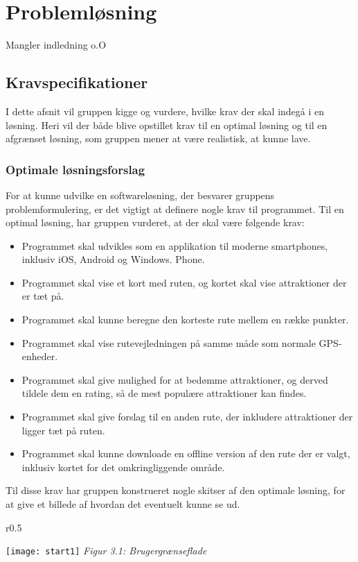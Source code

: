 \chapter{Problemløsning}
Mangler indledning o.O
\section{Kravspecifikationer}
I dette afsnit vil gruppen kigge og vurdere, hvilke krav der skal indegå i en løsning. Heri vil der både blive opstillet krav til en optimal løsning og til en afgrænset løsning, som gruppen mener at være realistisk, at kunne lave.

\subsection{Optimale løsningsforslag}
For at kunne udvilke en softwareløsning, der besvarer gruppens problemformulering, er det vigtigt at definere nogle krav til programmet. Til en optimal løsning, har gruppen vurderet, at der skal være følgende krav:
\begin{itemize}
	\item Programmet skal udvikles som en applikation til moderne smartphones, inklusiv iOS, Android og Windows. Phone. 
	\item Programmet skal vise et kort med ruten, og kortet skal vise attraktioner der er tæt på. 
	\item Programmet skal kunne beregne den korteste rute mellem en række punkter.
	\item Programmet skal vise rutevejledningen på samme måde som normale GPS-enheder. 
	\item Programmet skal give mulighed for at bedømme attraktioner, og derved tildele dem en rating, så de mest populære attraktioner kan findes. 
	\item Programmet skal give forslag til en anden rute, der inkludere attraktioner der ligger tæt på ruten.
	\item Programmet skal kunne  downloade en offline version af den rute der er valgt, inklusiv kortet for det omkringliggende område.
\end{itemize}
Til disse krav har gruppen konstrueret nogle skitser af den optimale løsning, for at give et billede af hvordan det eventuelt kunne se ud. \newline

\begin{wrapfigure}{r}{0.5\textwidth}
  \vspace{-20pt}
  \begin{center}
    \texttt{[image: start1]} \newline
    \textit{Figur 3.1: Brugergrænseflade}\newline
  \end{center}
  \vspace{-20pt}
  \vspace{-10pt}
\end{wrapfigure}


